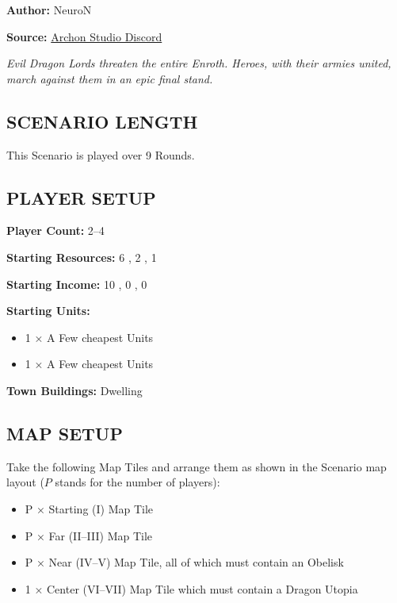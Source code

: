 
\begin{multicols}{2}

\textbf{Author:} NeuroN

\textbf{Source:} \href{https://discord.com/channels/740870068178649108/1332731339614453802/1332731339614453802}{Archon Studio Discord}

\textit{Evil Dragon Lords threaten the entire Enroth. Heroes, with their armies united, march against them in an epic final stand.}  %

\subsection*{\MakeUppercase{Scenario Length}}

This Scenario is played over 9 Rounds.

\subsection*{\MakeUppercase{Player Setup}}

\textbf{Player Count:} 2--4

\textbf{Starting Resources:} 6 , 2 , 1 

\textbf{Starting Income:} 10 , 0 , 0 

\textbf{Starting Units:}
\begin{itemize}
  \item  1 × A Few cheapest  Units
  \item  1 × A Few cheapest  Units
\end{itemize}

\textbf{Town Buildings:}  Dwelling

\subsection*{\MakeUppercase{Map Setup}}

Take the following Map Tiles and arrange them as shown in the Scenario map layout ($P$ stands for the number of players):

\begin{itemize}
  \item P × Starting (I) Map Tile
  \item P × Far (II--III) Map Tile
  \item P × Near (IV--V) Map Tile, all of which must contain an Obelisk
  \item 1 × Center (VI--VII) Map Tile which must contain a Dragon Utopia
\end{itemize}


\end{multicols}
